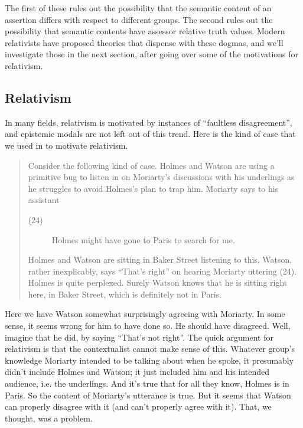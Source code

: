 \noindent The first of these rules out the possibility that the semantic content of an assertion differs with respect to different groups. The second rules out the possibility that semantic contents have assessor relative truth values. Modern relativists have proposed theories that dispense with these dogmas, and we'll investigate those in the next section, after going over some of the motivations for relativism.

\subsection{Relativism}
In many fields, relativism is motivated by instances of  ``faultless disagreement'', and epistemic modals are not left out of this trend. Here is the kind of case that we used in \citet{Egan2005-EGAEMI} to motivate relativism.

\begin{quote}
Consider the following kind of case. Holmes and Watson are using a primitive bug to listen in on Moriarty's discussions with his underlings as he struggles to avoid Holmes's plan to trap him. Moriarty says to his assistant

\begin{description}
\item[(24)]	Holmes might have gone to Paris to search for me.
\end{description}

\noindent Holmes and Watson are sitting in Baker Street listening to this. Watson, rather inexplicably, says ``That's right'' on hearing Moriarty uttering (24). Holmes is quite perplexed. Surely Watson knows that he is sitting right here, in Baker Street, which is definitely not in Paris.
\end{quote}

\noindent Here we have Watson somewhat surprisingly agreeing with Moriarty. In some sense, it seems wrong for him to have done so. He should have disagreed. Well, imagine that he did, by saying ``That's not right''. The quick argument for relativism is that the contextualist cannot make sense of this. Whatever group's knowledge Moriarty intended to be talking about when he spoke, it presumably didn't include Holmes and Watson; it just included him and his intended audience, i.e. the underlings. And it's true that for all they know, Holmes is in Paris. So the content of Moriarty's utterance is true. But it seems that Watson can properly disagree with it (and can't properly agree with it). That, we thought, was a problem.

